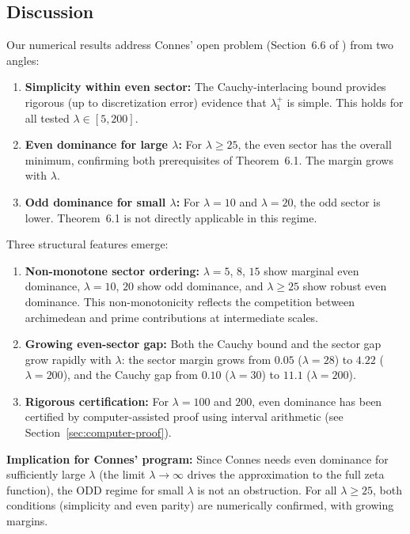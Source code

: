 \documentclass[12pt,a4paper]{article}
\theoremstyle{definition}
\theoremstyle{remark}
\begin{document}
\subsection{Discussion}

Our numerical results address Connes' open problem (Section~6.6 of \cite{Connes2025}) from two angles:
\begin{enumerate}
  \item \textbf{Simplicity within even sector:} The Cauchy-interlacing bound provides rigorous (up to discretization error) evidence that $\lambda_1^+$ is simple. This holds for all tested $\lambda \in [5, 200]$.
  \item \textbf{Even dominance for large $\lambda$:} For $\lambda \geq 25$, the even sector has the overall minimum, confirming both prerequisites of Theorem~6.1. The margin grows with $\lambda$.
  \item \textbf{Odd dominance for small $\lambda$:} For $\lambda = 10$ and $\lambda = 20$, the odd sector is lower. Theorem~6.1 is not directly applicable in this regime.
\end{enumerate}

Three structural features emerge:

\begin{enumerate}
  \item \textbf{Non-monotone sector ordering:} $\lambda = 5$, $8$, $15$ show marginal even dominance, $\lambda = 10$, $20$ show odd dominance, and $\lambda \geq 25$ show robust even dominance. This non-monotonicity reflects the competition between archimedean and prime contributions at intermediate scales.

  \item \textbf{Growing even-sector gap:} Both the Cauchy bound and the sector gap grow rapidly with $\lambda$: the sector margin grows from $0.05$ ($\lambda=28$) to $4.22$ ($\lambda=200$), and the Cauchy gap from $0.10$ ($\lambda=30$) to $11.1$ ($\lambda=200$).

  \item \textbf{Rigorous certification:} For $\lambda = 100$ and $200$, even dominance has been certified by computer-assisted proof using interval arithmetic (see Section~\ref{sec:computer-proof}).
\end{enumerate}

\textbf{Implication for Connes' program:} Since Connes needs even dominance for sufficiently large $\lambda$ (the limit $\lambda \to \infty$ drives the approximation to the full zeta function), the ODD regime for small $\lambda$ is not an obstruction. For all $\lambda \geq 25$, both conditions (simplicity and even parity) are numerically confirmed, with growing margins.
\end{document}

